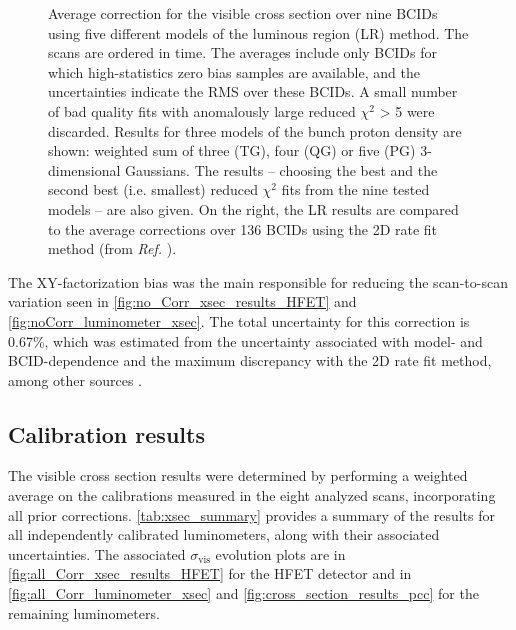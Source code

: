 \begin{figure}[!htb]
	\centering
	\caption[Factorization corrections on visible cross section from luminous region method.]{Average correction for the visible cross section over nine BCIDs using five different models of the luminous region (LR) method. The scans are ordered in time. The averages include only BCIDs for which high-statistics zero bias samples are available, and the uncertainties indicate the RMS over these BCIDs. A small number of bad quality fits with anomalously large reduced $\chi^2$ > 5 were discarded. Results for three models of the bunch proton density are shown: weighted sum of three (TG), four (QG) or five (PG) 3-dimensional Gaussians. The results – choosing the best and the second best (i.e. smallest) reduced $\chi^2$ fits from the nine tested models – are also given. On the right, the LR results are compared to the average corrections over 136 BCIDs using the 2D rate fit method (from \textit{Ref.} \cite{CMS-DP-2024-068}).}
	\label{fig:luminous_region_vs_2d_rate_fit}
\end{figure}

The XY-factorization bias was the main responsible for reducing the scan-to-scan variation seen in \autoref{fig:no_Corr_xsec_results_HFET} and \autoref{fig:noCorr_luminometer_xsec}. The total uncertainty for this correction is 0.67\%, which was estimated from the uncertainty associated with model- and BCID-dependence and the maximum discrepancy with the 2D rate fit method, among other sources \cite{CMS-PAS-LUM-22-001}.

\subsection{Calibration results}

The visible cross section results were determined by performing a weighted average on the calibrations measured in the eight analyzed scans, incorporating all prior corrections. \autoref{tab:xsec_summary} provides a summary of the results for all independently calibrated luminometers, along with their associated uncertainties. The associated $\sigma_{\mathrm{vis}}$ evolution plots are in \autoref{fig:all_Corr_xsec_results_HFET} for the HFET detector and in \autoref{fig:all_Corr_luminometer_xsec} and \autoref{fig:cross_section_results_pcc} for the remaining luminometers.

